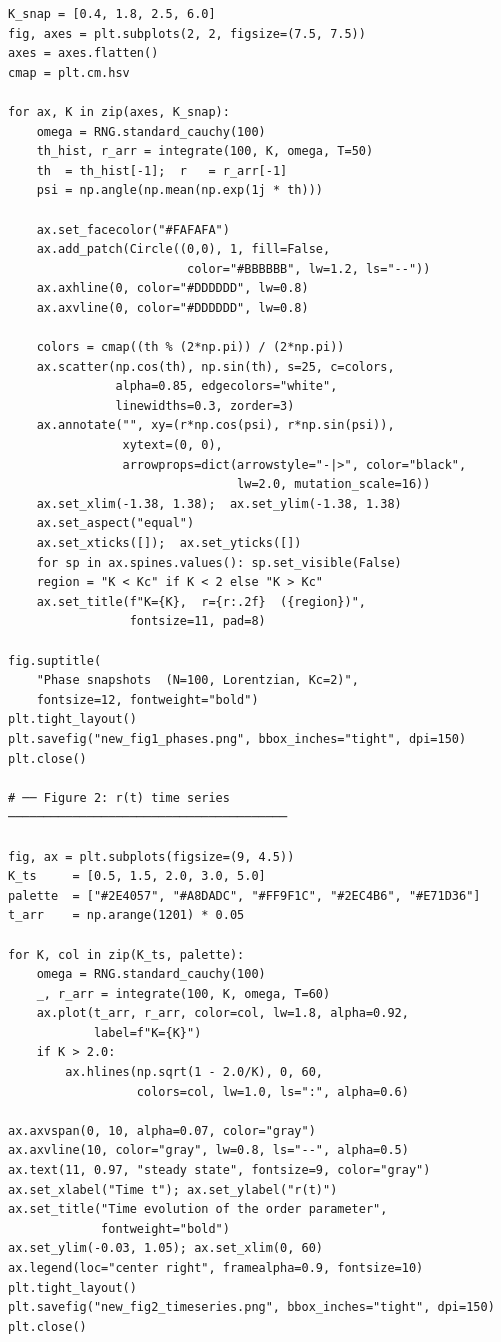 \documentclass[12pt,a4paper]{article}
\begin{document}
\begin{lstlisting}[caption={%
  Complete Kuramoto simulation code. Generates all four figures.},
  label={lst:main}]
K_snap = [0.4, 1.8, 2.5, 6.0]
fig, axes = plt.subplots(2, 2, figsize=(7.5, 7.5))
axes = axes.flatten()
cmap = plt.cm.hsv

for ax, K in zip(axes, K_snap):
    omega = RNG.standard_cauchy(100)
    th_hist, r_arr = integrate(100, K, omega, T=50)
    th  = th_hist[-1];  r   = r_arr[-1]
    psi = np.angle(np.mean(np.exp(1j * th)))

    ax.set_facecolor("#FAFAFA")
    ax.add_patch(Circle((0,0), 1, fill=False,
                         color="#BBBBBB", lw=1.2, ls="--"))
    ax.axhline(0, color="#DDDDDD", lw=0.8)
    ax.axvline(0, color="#DDDDDD", lw=0.8)

    colors = cmap((th % (2*np.pi)) / (2*np.pi))
    ax.scatter(np.cos(th), np.sin(th), s=25, c=colors,
               alpha=0.85, edgecolors="white",
               linewidths=0.3, zorder=3)
    ax.annotate("", xy=(r*np.cos(psi), r*np.sin(psi)),
                xytext=(0, 0),
                arrowprops=dict(arrowstyle="-|>", color="black",
                                lw=2.0, mutation_scale=16))
    ax.set_xlim(-1.38, 1.38);  ax.set_ylim(-1.38, 1.38)
    ax.set_aspect("equal")
    ax.set_xticks([]);  ax.set_yticks([])
    for sp in ax.spines.values(): sp.set_visible(False)
    region = "K < Kc" if K < 2 else "K > Kc"
    ax.set_title(f"K={K},  r={r:.2f}  ({region})",
                 fontsize=11, pad=8)

fig.suptitle(
    "Phase snapshots  (N=100, Lorentzian, Kc=2)",
    fontsize=12, fontweight="bold")
plt.tight_layout()
plt.savefig("new_fig1_phases.png", bbox_inches="tight", dpi=150)
plt.close()

# ── Figure 2: r(t) time series ───────────────────────────────────────

fig, ax = plt.subplots(figsize=(9, 4.5))
K_ts     = [0.5, 1.5, 2.0, 3.0, 5.0]
palette  = ["#2E4057", "#A8DADC", "#FF9F1C", "#2EC4B6", "#E71D36"]
t_arr    = np.arange(1201) * 0.05

for K, col in zip(K_ts, palette):
    omega = RNG.standard_cauchy(100)
    _, r_arr = integrate(100, K, omega, T=60)
    ax.plot(t_arr, r_arr, color=col, lw=1.8, alpha=0.92,
            label=f"K={K}")
    if K > 2.0:
        ax.hlines(np.sqrt(1 - 2.0/K), 0, 60,
                  colors=col, lw=1.0, ls=":", alpha=0.6)

ax.axvspan(0, 10, alpha=0.07, color="gray")
ax.axvline(10, color="gray", lw=0.8, ls="--", alpha=0.5)
ax.text(11, 0.97, "steady state", fontsize=9, color="gray")
ax.set_xlabel("Time t"); ax.set_ylabel("r(t)")
ax.set_title("Time evolution of the order parameter",
             fontweight="bold")
ax.set_ylim(-0.03, 1.05); ax.set_xlim(0, 60)
ax.legend(loc="center right", framealpha=0.9, fontsize=10)
plt.tight_layout()
plt.savefig("new_fig2_timeseries.png", bbox_inches="tight", dpi=150)
plt.close()


\end{lstlisting}
\end{document}
